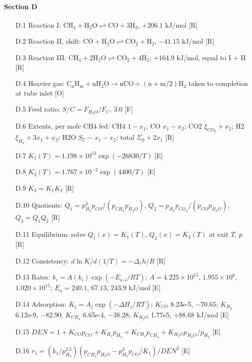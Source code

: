 \paragraph{Section D}
\begin{enumerate}[leftmargin=1.4cm,itemsep=0pt,topsep=2pt,parsep=0pt]\small
\item[D.1] Reaction I: $\mathrm{CH_4+H_2O\rightleftharpoons CO+3H_2}$, $+206.1$ kJ/mol {\footnotesize [R]}
\item[D.2] Reaction II, shift: $\mathrm{CO+H_2O\rightleftharpoons CO_2+H_2}$, $-41.15$ kJ/mol {\footnotesize [R]}
\item[D.3] Reaction III: $\mathrm{CH_4+2H_2O\rightleftharpoons CO_2+4H_2}$, $+164.9$ kJ/mol, equal to I + II {\footnotesize [R]}
\item[D.4] Heavier gas: $\mathrm{C_nH_m+nH_2O\to nCO+(n+m/2)H_2}$ taken to completion at tube inlet {\footnotesize [O]}
\item[D.5] Feed ratio: $S/C=F_{H_2O}/F_C$, 3.0 {\footnotesize [F]}
\item[D.6] Extents, per mole CH4 fed: CH4 $1-x_1$; CO $x_1-x_2$; CO2 $\xi_{CO_2}+x_2$; H2 $\xi_{H_2}+3x_1+x_2$; H2O $S_C-x_1-x_2$; total $\Sigma_0+2x_1$ {\footnotesize [R]}
\item[D.7] $K_1(T)=1.198\times10^{13}\exp(-26830/T)$ {\footnotesize [E]}
\item[D.8] $K_2(T)=1.767\times10^{-2}\exp(4400/T)$ {\footnotesize [E]}
\item[D.9] $K_3=K_1K_2$ {\footnotesize [R]}
\item[D.10] Quotients: $Q_1=p_{H_2}^3p_{CO}/(p_{CH_4}p_{H_2O})$, $Q_2=p_{H_2}p_{CO_2}/(p_{CO}p_{H_2O})$, $Q_3=Q_1Q_2$ {\footnotesize [R]}
\item[D.11] Equilibrium: solve $Q_1(x)=K_1(T)$, $Q_2(x)=K_2(T)$ at exit $T$, $p$ {\footnotesize [R]}
\item[D.12] Consistency: $d\ln K/d(1/T)=-\Delta_rh/R$ {\footnotesize [R]}
\item[D.13] Rates: $k_i=A(k_i)\exp(-E_{a,i}/RT)$; $A=4.225\times10^{15}$, $1.955\times10^{6}$, $1.020\times10^{15}$; $E_a=240.1$, $67.13$, $243.9$ kJ/mol {\footnotesize [E]}
\item[D.14] Adsorption: $K_j=A_j\exp(-\Delta H_j/RT)$; $K_{CO}$ 8.23e-5, $-70.65$; $K_{H_2}$ 6.12e-9, $-82.90$; $K_{CH_4}$ 6.65e-4, $-38.28$; $K_{H_2O}$ 1.77e5, $+88.68$ kJ/mol {\footnotesize [E]}
\item[D.15] $DEN=1+K_{CO}p_{CO}+K_{H_2}p_{H_2}+K_{CH_4}p_{CH_4}+K_{H_2O}p_{H_2O}/p_{H_2}$ {\footnotesize [E]}
\item[D.16] $r_1=(k_1/p_{H_2}^{2.5})(p_{CH_4}p_{H_2O}-p_{H_2}^3p_{CO}/K_1)/DEN^2$ {\footnotesize [E]}

\end{enumerate}
